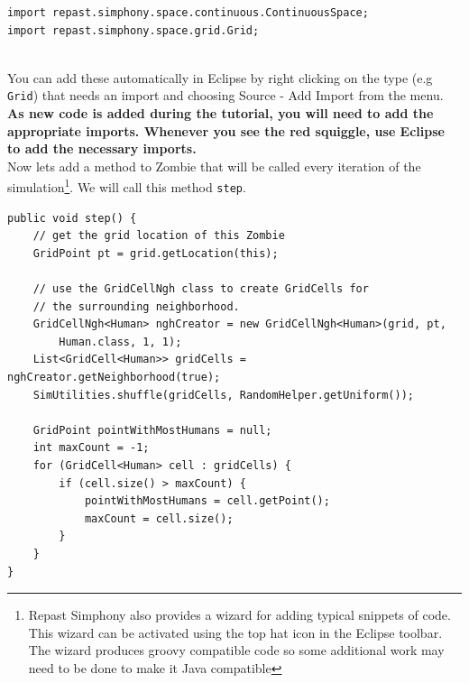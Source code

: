 \documentclass[11pt]{amsart}
\begin{document}
\noindent\begin{minipage}[h]{\textwidth}
\vspace{.2in}
\lstset{language=java,caption=Zombie Imports}
\begin{lstlisting}
import repast.simphony.space.continuous.ContinuousSpace;
import repast.simphony.space.grid.Grid;
  
\end{lstlisting}
\vspace{.2in}
\end{minipage}
You can add these automatically in Eclipse by right clicking on the type (e.g  \texttt{Grid}) that needs an import and choosing Source - Add Import from the menu. \textbf{As new code is added during the tutorial, you will need to add the appropriate imports. Whenever you see the red squiggle, use Eclipse to add the necessary imports.}\\


Now lets add a method to Zombie that will be called every iteration of the simulation\footnote{Repast Simphony also provides a wizard for adding typical snippets of code. This wizard can be activated using the top hat icon in the Eclipse toolbar. The wizard produces groovy compatible code so some additional work may need to be done to make it Java compatible}.  We will call this method \texttt{step}.

\noindent\begin{minipage}[h]{\textwidth}
\vspace{.2in}
\lstset{language=java,caption=step Method}
\begin{lstlisting}
public void step() {
	// get the grid location of this Zombie
	GridPoint pt = grid.getLocation(this);
	
	// use the GridCellNgh class to create GridCells for 
	// the surrounding neighborhood.
	GridCellNgh<Human> nghCreator = new GridCellNgh<Human>(grid, pt, 
		Human.class, 1, 1);
	List<GridCell<Human>> gridCells = nghCreator.getNeighborhood(true);
	SimUtilities.shuffle(gridCells, RandomHelper.getUniform());
	
	GridPoint pointWithMostHumans = null;
	int maxCount = -1;
	for (GridCell<Human> cell : gridCells) {
		if (cell.size() > maxCount) {
			pointWithMostHumans = cell.getPoint();
			maxCount = cell.size();
		}
	}
}
\end{lstlisting}
\vspace{.2in}
\end{minipage}
\end{document}
